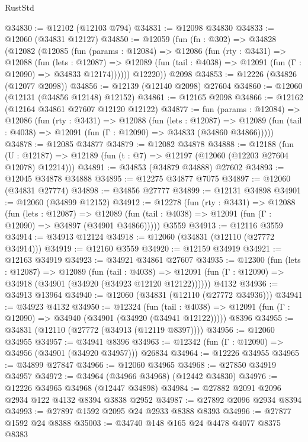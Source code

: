 \begin{lexlean}{RustStd}
\begin{coremodule}
@34830 := @12102 (@12103 @794)
@34831 := @12098 @34830
@34833 := @12060 (@34831 @12127)
@34850 := @12059
    (fun (fn : @302) =>
    @34828
      (@12082
        (@12085
          (fun (params : @12084) =>
          @12086
            (fun (rty : @3431) =>
            @12088
              (fun (lets : @12087) =>
              @12089 (fun (tail : @4038) => @12091 (fun (Γ : @12090) => @34833 @12174))))))
        @12220))
    @2098
@34853 := @12226 (@34826 (@12077 @2098))
@34856 := @12139 (@12140 @2098) @27604
@34860 := @12060 (@12131 (@34856 @12148) @12152)
@34861 := @12165 @2098
@34866 := @12162 (@12164 @34861 @27607 @12120 @12122)
@34877 := fun (params : @12084) =>
  @12086
    (fun (rty : @3431) =>
    @12088
      (fun (lets : @12087) =>
      @12089 (fun (tail : @4038) => @12091 (fun (Γ : @12090) => @34833 (@34860 @34866)))))
@34878 := @12085 @34877
@34879 := @12082 @34878
@34888 := @12188
    (fun (U : @12187) => @12189 (fun (t : @7) => @12197 (@12060 (@12203 @27604 @12078) @12214)))
@34891 := @34853 (@34879 @34888) @27602
@34893 := @12045 @34878 @34888
@34895 := @12275 @34877 @7075
@34897 := @12060 (@34831 @27774)
@34898 := @34856 @27777
@34899 := @12131 @34898
@34901 := @12060 (@34899 @12152)
@34912 := @12278
    (fun (rty : @3431) =>
    @12088
      (fun (lets : @12087) =>
      @12089 (fun (tail : @4038) => @12091 (fun (Γ : @12090) => @34897 (@34901 @34866)))))
    @3559
@34913 := @12116 @3559
@34914 := @34913 @12124
@34918 := @12060 (@34831 (@12110 (@27772 @34914)))
@34919 := @12160 @3559
@34920 := @12159 @34919
@34921 := @12163 @34919
@34923 := @34921 @34861 @27607
@34935 := @12300
    (fun (lets : @12087) =>
    @12089
      (fun (tail : @4038) =>
      @12091 (fun (Γ : @12090) => @34918 (@34901 (@34920 (@34923 @12120 @12122))))))
    @4132
@34936 := @34913 @13964
@34940 := @12060 (@34831 (@12110 (@27772 @34936)))
@34941 := @34923 @4132
@34950 := @12324
    (fun (tail : @4038) => @12091 (fun (Γ : @12090) => @34940 (@34901 (@34920 (@34941 @12122)))))
    @8396
@34955 := @34831 (@12110 (@27772 (@34913 (@12119 @8397))))
@34956 := @12060 @34955
@34957 := @34941 @8396
@34963 := @12342 (fun (Γ : @12090) => @34956 (@34901 (@34920 @34957))) @26834
@34964 := @12226 @34955
@34965 := @34899 @27847
@34966 := @12060 @34965
@34968 := @27850 @34919 @34957
@34972 := @34964 (@34966 @34968) (@12442 @34830)
@34976 := @12226 @34965 @34968 (@12447 @34898)
@34984 := @27882 @2091 @2096 @2934 @122 @4132 @8394 @3838 @2952
@34987 := @27892 @2096 @2934 @8394
@34993 := @27897 @1592 @2095 @24 @2933 @8388 @8393
@34996 := @27877 @1592 @24 @8388
@35003 := @34740 @148 @165 @24 @4478 @4077 @8375 @8383

\end{coremodule}
\end{lexlean}
